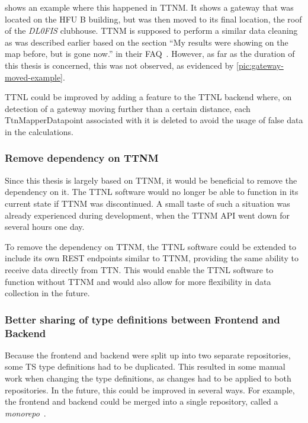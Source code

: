  shows an example where this happened in \ac{TTNM}.
It shows a gateway that was located on the \ac{HFU} B building, but was then moved to its final location, the roof of the \emph{DL0FIS} clubhouse.
\ac{TTNM} is supposed to perform a similar data cleaning as was described earlier based on the section ``My results were showing on the map before, but is gone now.'' in their FAQ~\cite{ttn_mapper_faq_nodate}.
However, as far as the duration of this thesis is concerned, this was not observed, as evidenced by \cref{pic:gateway-moved-example}.

\ac{TTNL} could be improved by adding a feature to the \ac{TTNL} backend where, on detection of a gateway moving further than a certain distance, each TtnMapperDatapoint associated with it is deleted to avoid the usage of false data in the calculations.

\subsubsection{Remove dependency on \acl{TTNM}}

Since this thesis is largely based on \ac{TTNM}, it would be beneficial to remove the dependency on it.
The \ac{TTNL} software would no longer be able to function in its current state if \ac{TTNM} was discontinued.
A small taste of such a situation was already experienced during development, when the \ac{TTNM} \ac{API} went down for several hours one day.

To remove the dependency on \ac{TTNM}, the \ac{TTNL} software could be extended to include its own \ac{REST} endpoints similar to \ac{TTNM}, providing the same ability to receive data directly from \ac{TTN}.
This would enable the \ac{TTNL} software to function without \ac{TTNM} and would also allow for more flexibility in data collection in the future.

\subsubsection{Better sharing of type definitions between Frontend and Backend}\label{subsubsec:outlook-sharing-type-definitions}

Because the frontend and backend were split up into two separate repositories, some \ac{TS} type definitions had to be duplicated.
This resulted in some manual work when changing the type definitions, as changes had to be applied to both repositories.
In the future, this could be improved in several ways.
For example, the frontend and backend could be merged into a single repository, called a \emph{monorepo}~\cite{narwhal_technologies_inc_monorepo_2022}.

